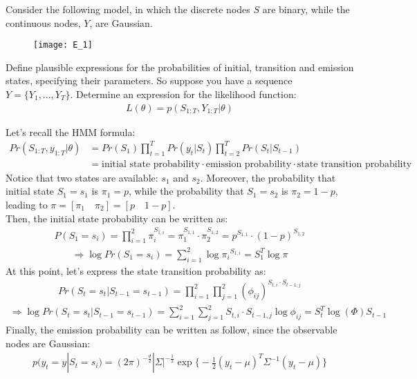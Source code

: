 \Exercise[number={1}]
Consider the following model, in which the discrete nodes \(S\) are binary,
while the continuous nodes, \(Y\), are Gaussian.
\begin{figure}[H]
    \texttt{[image: E\_1]}
    \centering
\end{figure}
Define plausible expressions for the probabilities of initial, transition
and emission states, specifying their parameters. So suppose you have a
sequence \(Y=\{Y_1,...,Y_T\}\). Determine an expression for the likelihood
function:
\begin{align*}
    L(\theta)=p(S_{1:T}, Y_{1:T}|\theta)
\end{align*}

\Answer[number={1}]
Let's recall the HMM formula:
\begin{align*}
    Pr(S_{1:T}, y_{1:T}|\theta)
    &=Pr(S_1)\prod_{t=1}^{T}Pr(y_t|S_t)\prod_{t=2}^{T}Pr(S_t|S_{t-1})\\
    &=\text{initial state probability}\cdot\text{emission probability}\cdot\text{state transition probability}
\end{align*}
Notice that two states are available: \(s_1\) and \(s_2\). Moreover, the
probability that initial state \(S_1=s_1\) is \(\pi_1=p\), while the probability
that \(S_1=s_2\) is \(\pi_2=1-p\), leading to
\(\pi=[\pi_1\quad\pi_2]=[p\quad{1-p}]\).\\
Then, the initial state probability can be written as:
\begin{align*}
    P(S_1=s_i)
    =\prod_{i=1}^{2}\pi_i^{S_{1,i}}
    =\pi_1^{S_{1,1}}\cdot\pi_2^{S_{1,2}}
    =p^{S_{1,1}}\cdot(1-p)^{S_{1,2}}
\end{align*}
\begin{align*}
    \Rightarrow
    \log{Pr(S_1=s_i)}
    =\sum_{i=1}^{2}\log{\pi_i}^{S_{1,i}}
    =S_1^T\log{\pi}
\end{align*}
At this point, let's express the state transition probability as:
\begin{align*}
    Pr(S_t=s_t|S_{t-1}=s_{t-1})
    =\prod_{i=1}^2\prod_{j=1}^2(\phi_{ij})^{S_{t,i}\cdot S_{t-1,j}}
\end{align*}
\begin{align*}
    \Rightarrow
    \log{Pr(S_t=s_t|S_{t-1}=s_{t-1})}
    =\sum_{i=1}^2\sum_{j=1}^2S_{t,i}\cdot S_{t-1,j}\log{\phi_{ij}}
    =S_t^T\log{(\Phi)}S_{t-1}
\end{align*}
Finally, the emission probability can be written as follow, since the
observable nodes are Gaussian:
\begin{align*}
    p(y_t=y|S_t=s_i)
    =(2\pi)^{-\frac{d}{2}}|\Sigma|^{-\frac{1}{2}}\exp{\biggl\{-\frac{1}{2}(y_t-\mu)^T\Sigma^{-1}(y_t-\mu)\biggr\}}
\end{align*}
